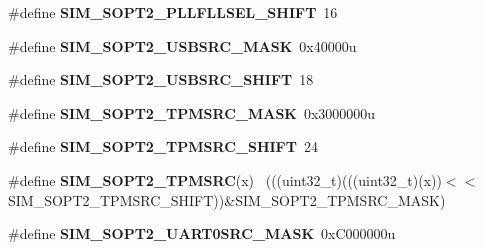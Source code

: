 \begin{DoxyCompactItemize}
\item 
\hypertarget{group___s_i_m___register___masks_gae98b4d574b65472bdb294092d4ce5b4a}{}\#define {\bfseries S\+I\+M\+\_\+\+S\+O\+P\+T2\+\_\+\+P\+L\+L\+F\+L\+L\+S\+E\+L\+\_\+\+S\+H\+I\+F\+T}~16\label{group___s_i_m___register___masks_gae98b4d574b65472bdb294092d4ce5b4a}

\item 
\hypertarget{group___s_i_m___register___masks_ga1caf7ffe2555eb59ed410110b6aba463}{}\#define {\bfseries S\+I\+M\+\_\+\+S\+O\+P\+T2\+\_\+\+U\+S\+B\+S\+R\+C\+\_\+\+M\+A\+S\+K}~0x40000u\label{group___s_i_m___register___masks_ga1caf7ffe2555eb59ed410110b6aba463}

\item 
\hypertarget{group___s_i_m___register___masks_ga2a455b7e86f26185c92961e139d13a89}{}\#define {\bfseries S\+I\+M\+\_\+\+S\+O\+P\+T2\+\_\+\+U\+S\+B\+S\+R\+C\+\_\+\+S\+H\+I\+F\+T}~18\label{group___s_i_m___register___masks_ga2a455b7e86f26185c92961e139d13a89}

\item 
\hypertarget{group___s_i_m___register___masks_gab515715932139549d30bb4b6f3e2dc99}{}\#define {\bfseries S\+I\+M\+\_\+\+S\+O\+P\+T2\+\_\+\+T\+P\+M\+S\+R\+C\+\_\+\+M\+A\+S\+K}~0x3000000u\label{group___s_i_m___register___masks_gab515715932139549d30bb4b6f3e2dc99}

\item 
\hypertarget{group___s_i_m___register___masks_gac70dc9abda7a707019da3d8fed90a265}{}\#define {\bfseries S\+I\+M\+\_\+\+S\+O\+P\+T2\+\_\+\+T\+P\+M\+S\+R\+C\+\_\+\+S\+H\+I\+F\+T}~24\label{group___s_i_m___register___masks_gac70dc9abda7a707019da3d8fed90a265}

\item 
\hypertarget{group___s_i_m___register___masks_gabd5461d4ec1af7320ca24eba24866bb7}{}\#define {\bfseries S\+I\+M\+\_\+\+S\+O\+P\+T2\+\_\+\+T\+P\+M\+S\+R\+C}(x)                                        ~(((uint32\+\_\+t)(((uint32\+\_\+t)(x))$<$$<$S\+I\+M\+\_\+\+S\+O\+P\+T2\+\_\+\+T\+P\+M\+S\+R\+C\+\_\+\+S\+H\+I\+F\+T))\&S\+I\+M\+\_\+\+S\+O\+P\+T2\+\_\+\+T\+P\+M\+S\+R\+C\+\_\+\+M\+A\+S\+K)\label{group___s_i_m___register___masks_gabd5461d4ec1af7320ca24eba24866bb7}

\item 
\hypertarget{group___s_i_m___register___masks_ga9527f6a7148fe172b12a87e0b3b92492}{}\#define {\bfseries S\+I\+M\+\_\+\+S\+O\+P\+T2\+\_\+\+U\+A\+R\+T0\+S\+R\+C\+\_\+\+M\+A\+S\+K}~0x\+C000000u\label{group___s_i_m___register___masks_ga9527f6a7148fe172b12a87e0b3b92492}


\end{DoxyCompactItemize}
